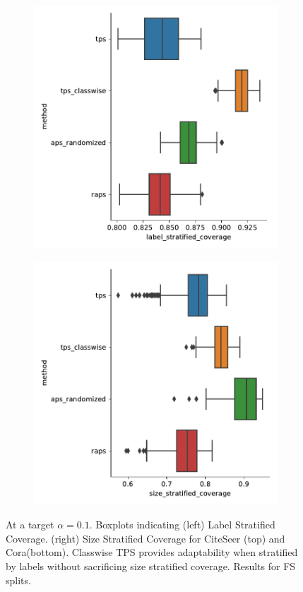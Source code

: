\begin{figure}
    \begin{subfigure}{0.48\linewidth}
    \includegraphics[width=\linewidth]{graphConformal/figures/split/cora_label_stratified_coverage}
    \end{subfigure}
    \begin{subfigure}{0.48\linewidth}
        \includegraphics[width=\linewidth]{graphConformal/figures/split/cora_size_stratified_coverage} 
     \end{subfigure}
     \caption{At a target $\alpha = 0.1$. Boxplots indicating (left) Label Stratified Coverage. (right) Size Stratified Coverage for CiteSeer (top) and Cora(bottom). Classwise TPS provides adaptability when stratified by labels without sacrificing size stratified coverage. Results for FS splits.}
     \label{fig:fs:conformal:citeseer_adaptability}
\end{figure}
